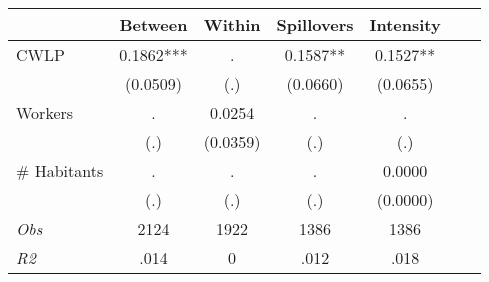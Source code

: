 \begin{tabular}{l*{6}{c}}\hline&\multicolumn{1}{c}{Between}&\multicolumn{1}{c}{Within}&\multicolumn{1}{c}{Spillovers}&\multicolumn{1}{c}{Intensity}\\ \hline 
CWLP & 0.1862*** & . & 0.1587** & 0.1527** \\
 & (0.0509) & (.) & (0.0660) & (0.0655) \\
Workers & . & 0.0254 & . & . \\
 & (.) & (0.0359) & (.) & (.) \\
\# Habitants & . & . & . & 0.0000 \\
  & (.) & (.) & (.) & (0.0000) \\
\hline \textit{Obs} & 2124 & 1922 & 1386 & 1386  \\ \textit{R2} & .014 & 0 & .012 & .018 \\ \hline \end{tabular}
